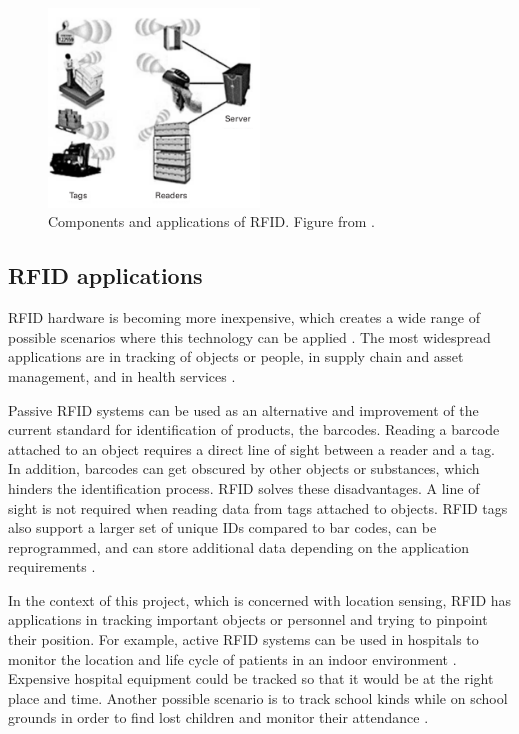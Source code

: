 \begin{figure}[h]
	\begin{center}
		\includegraphics[width=0.5\textwidth]{figures/rfidsys}
		\caption{Components and applications of RFID. Figure from \cite[p. 20]{Rida2010}.}
		\label{fig:rfidsys}
	\end{center}
\end{figure}

\subsection{RFID applications}

RFID hardware is becoming more inexpensive, which creates a wide range of possible scenarios where this technology can be applied \cite{Nath2006}. The most widespread applications are in tracking of objects or people, in supply chain and asset management, and in health services \cite{Weinstein2005}.

Passive RFID systems can be used as an alternative and improvement of the current standard for identification of products, the barcodes.  Reading a barcode attached to an object requires a direct line of sight between a reader and a tag. In addition, barcodes can get obscured by other objects or substances, which hinders the identification process. RFID solves these disadvantages. A line of sight is not required when reading data from tags attached to objects. RFID tags also support a larger set of unique IDs compared to bar codes, can be reprogrammed, and can store additional data depending on the application requirements \cite{Weinstein2005}.

In the context of this project, which is concerned with location sensing, RFID has applications in tracking important objects or personnel and trying to pinpoint their position. For example, active RFID systems can be used in hospitals to monitor the location and life cycle of patients in an indoor environment \cite{Cangialosi2007}. Expensive hospital equipment could be tracked so that it would be at the right place and time. Another possible scenario is to track school kinds while on school grounds in order to find lost children and monitor their attendance \cite{Swartz2004}.

